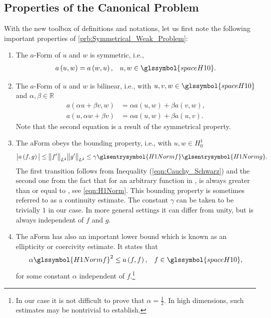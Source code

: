 \subsection{Properties of the Canonical Problem}
With the new toolbox of definitions and notations, let us first note the following important properties of \cref{prb:Symmetrical_Weak_Problem}:
\begin{enumerate}
	
	\item The $a$-Form of $u$ and $w$ is symmetric, i.e.,
	\begin{align}	\label{eqn:Property_Symmetry}
		a \left( u, w \right) &= a \left( w, u \right),	& u, w \in \glssymbol{spaceH10}.
	\end{align}
	
	\item The $a$-Form of $u$ and $w$ is bilinear, i.e., with $u, v, w \in \glssymbol{spaceH10}$ and $\alpha, \beta \in \mathbb{R}$
	\begin{equation}	\label{eqn:Property_Bilinear}		
		\begin{aligned}
			a \left( \alpha u + \beta v, w \right) &= \alpha a \left( u, w \right) + \beta a \left( v, w \right), \\
			a \left( u, \alpha w + \beta v \right) &= \alpha a \left( u, w \right) + \beta a \left( u, v \right).
		\end{aligned}
	\end{equation}		
	Note that the second equation is a result of the symmetrical property.
	
	\item The \gls{aForm} obeys the bounding property, i.e., with $u, w \in H_0^1$ 
	\begin{equation}	\label{eqn:Property_Bounding}
		\big \vert a \left( f, g \right) \big \vert \leq \big\| f^\prime \big\|_{ L^2 } \big\| g^\prime \big\|_{ L^2 } \leq
			\gamma \glsentrysymbol{H1Normf} \glsentrysymbol{H1Normg}.
	\end{equation}
	The first transition follows from Inequality (\ref{eqn:Cauchy_Schwarz}) and the second one from the fact that for an arbitrary
	function in ,  is always greater than or equal to ,
	see \cref{eqn:H1Norm}. This bounding property is sometimes referred to as a continuity estimate. The constant $\gamma$ can be
	taken to be trivially $1$ in our case. In more general settings it can differ from unity, but is always independent of $f$ and $g$.
	
	\item The \gls{aForm} has also an important lower bound which is known as an ellipticity or coercivity estimate. It states that
	\begin{align}	\label{eqn:Property_Elipticity}
		\alpha \glssymbol{H1Normf}^2 &\leq a \left( f, f \right),	& f \in \glssymbol{spaceH10},
	\end{align}
	for some constant $\alpha$ independent of $f$.\footnote{In our case it is not difficult to prove that $\alpha = \frac{1}{2}$.
	In high dimensions, such estimates may be nontrivial to establish.}
	

\end{enumerate}
